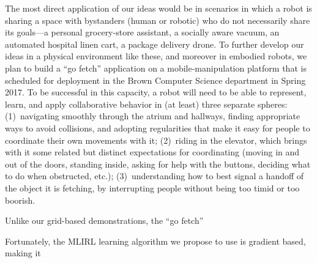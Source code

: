 The most direct application of our ideas would be in scenarios in
which a robot is sharing a space with bystanders (human or robotic)
who do not necessarily share its goals---a personal grocery-store
assistant, a socially aware vacuum, an automated hospital linen cart,
a package delivery drone.  To further develop our ideas in a physical
environment like these, and moreover in embodied robots,
we plan to build a ``go fetch'' application on a mobile-manipulation
platform that is scheduled for deployment in the Brown Computer
Science department in Spring 2017.  To be successful in this capacity,
a robot will need to be able to represent, learn, and apply
collaborative behavior in (at least) three separate spheres:
%
(1)~navigating smoothly through the atrium and hallways, finding
  appropriate ways to avoid collisions, and adopting regularities that
  make it easy for people to coordinate their own movements with it;
%
(2)~riding in the elevator, which brings with it some related but
  distinct expectations for coordinating (moving in and out of the
  doors, standing inside, asking for help with the buttons, deciding
  what to do when obstructed, etc.);
%
(3)~understanding how to best signal a handoff of the object it is
  fetching, by interrupting people without being too timid or too
  boorish.


Unlike our grid-based demonstrations, the ``go fetch'' 

Fortunately, the MLIRL learning algorithm we propose to use is
gradient based, making it 


~\cite{silver16}



